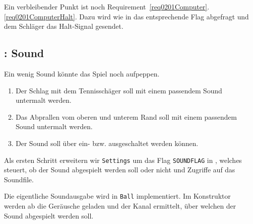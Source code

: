 
Ein verbleibender Punkt ist noch Requirement~\ref{req0201Computer}.\ref{req0201ComputerHalt}. Dazu wird wie in  das entsprechende Flag abgefragt und dem Schläger das Halt-Signal gesendet.




\subsection{: Sound}

Ein wenig Sound könnte das Spiel noch aufpeppen.

\begin{enumerate}
	\item Der Schlag mit dem Tennisschäger soll mit einem passendem Sound untermalt werden.\label{req0201Sound1}
	
	\item Das Abprallen vom oberen und unterem Rand soll mit einem passendem Sound untermalt werden.\label{req0201Sound2}
	
	\item Der Sound soll über  ein- bzw. ausgeschaltet werden können.\label{req0201Sound3}
	
\end{enumerate}
\er

Als ersten Schritt erweitern wir \texttt{Settings} um das Flag \texttt{SOUNDFLAG} in , welches steuert, ob der Sound abgespielt werden soll oder nicht und Zugriffe auf das Soundfile.


Die eigentliche Soundausgabe wird in \texttt{Ball} implementiert. Im Konstruktor werden ab  die Geräusche geladen und der Kanal ermittelt, über welchen der Sound abgespielt werden soll.



